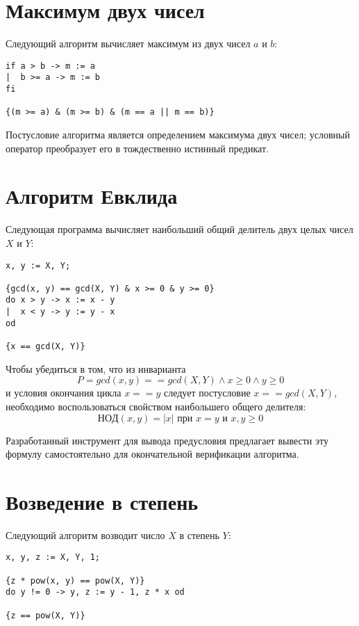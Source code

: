 \section{Максимум двух чисел}
Следующий алгоритм вычисляет максимум из двух чисел $a$ и $b$:
\begin{BVerbatim}
if a > b -> m := a
|  b >= a -> m := b
fi

{(m >= a) & (m >= b) & (m == a || m == b)}
\end{BVerbatim}

Постусловие алгоритма является определением максимума двух чисел; условный оператор преобразует его 
в тождественно истинный предикат. 

\section{Алгоритм Евклида}
Следующая программа вычисляет наибольший общий делитель двух целых чисел $X$ и $Y$:
\begin{BVerbatim}
x, y := X, Y;

{gcd(x, y) == gcd(X, Y) & x >= 0 & y >= 0}
do x > y -> x := x - y
|  x < y -> y := y - x
od

{x == gcd(X, Y)}
\end{BVerbatim}

Чтобы убедиться в том, что из инварианта
\begin{equation}
    P = gcd(x, y) == gcd(X, Y) \wedge x \geq 0 \wedge y \geq 0
\end{equation}
и условия окончания цикла $x == y$ следует постусловие $x == gcd(X, Y)$, необходимо
воспользоваться свойством наибольшего общего делителя:
\begin{equation}
    НОД(x, y) = |x|\text{ при } x = y\text{ и }x, y \geq 0
\end{equation}

Разработанный инструмент для вывода предусловия предлагает вывести эту формулу самостоятельно для 
окончательной верификации алгоритма.

\section{Возведение в степень}
Следующий алгоритм возводит число $X$ в степень $Y$:
\begin{verbatim}
x, y, z := X, Y, 1;

{z * pow(x, y) == pow(X, Y)}
do y != 0 -> y, z := y - 1, z * x od

{z == pow(X, Y)}
\end{verbatim} 

